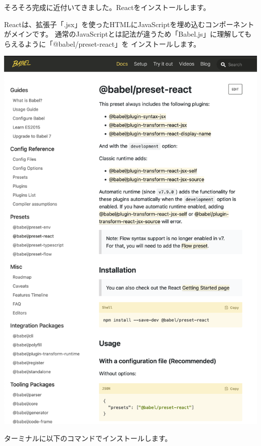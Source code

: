 そろそろ完成に近付いてきました。Reactをインストールします。

\vspace*{\baselineskip}

Reactは、拡張子「.jsx」を使ったHTMLにJavaScriptを埋め込むコンポーネントがメインです。
通常のJavaScriptとは記法が違うため「Babel.js」に理解してもらえるように「@babel/preset{-}react」を
インストールします。

\begin{reviewimage}%
\includegraphics[width=0.9\maxwidth]{./images/02-create-react-app/babel08.png}%
\label{image:02-create-react-app:babel08}
\end{reviewimage}

\clearpage


ターミナルに以下のコマンドでインストールします。

